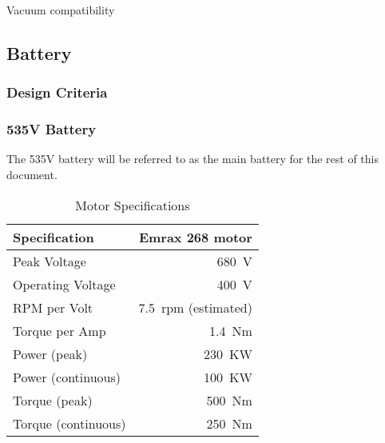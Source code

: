 \documentclass[main.tex]{subfile}
\begin{document}
    Vacuum compatibility\\

    \subsection{Battery}
    \subsubsection{Design Criteria}
    \subsubsection{535V Battery}
    The 535V battery will be referred to as the main battery for the rest of this document.\\

    \begin{table}[H]
        \centering
        \begin{tabular}{@{}lr@{}} \toprule
            Specification & Emrax 268 motor\\ \midrule
            Peak Voltage & \SI{680}{V}\\
            Operating Voltage & \SI{400}{V}\\
            RPM per Volt & \SI{7.5}{rpm} (estimated)\\
            Torque per Amp & \SI{1.4}{Nm}\\
            Power (peak) & \SI{230}{KW}\\
            Power (continuous) & \SI{100}{KW}\\
            Torque (peak) & \SI{500}{Nm}\\
            Torque (continuous) & \SI{250}{Nm}\\ \bottomrule
        \end{tabular}
        \caption{Motor Specifications}
    \end{table}
\end{document}
